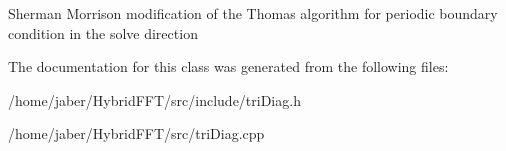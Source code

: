 Sherman Morrison modification of the Thomas algorithm for periodic boundary condition in the solve direction 

The documentation for this class was generated from the following files\+:\begin{DoxyCompactItemize}
\item 
/home/jaber/\+Hybrid\+F\+F\+T/src/include/tri\+Diag.\+h\item 
/home/jaber/\+Hybrid\+F\+F\+T/src/tri\+Diag.\+cpp\end{DoxyCompactItemize}
